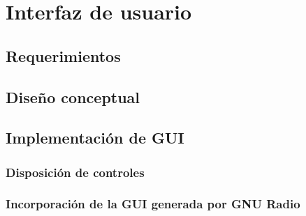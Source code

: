 \documentclass[../../main.tex]{subfiles}
\begin{document}
\graphicspath{{./figures}}
\chapter{Interfaz de usuario}

\section{Requerimientos}

\section{Diseño conceptual}

\section{Implementación de GUI}
\subsection{Disposición de controles}
\subsection{Incorporación de la GUI generada por GNU Radio}
\end{document}
